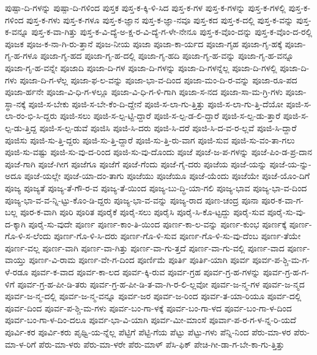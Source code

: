 {ಪುಷ್ಪಾ-ದಿ-ಗಳನ್ನು
ಪುಷ್ಪಾ-ದಿ-ಗಳಿಂದ
ಪುಸ್ತಕ
ಪುಸ್ತ-ಕ-ಕ್ಕಿ-ಳಿ-ಸಿದ
ಪುಸ್ತ-ಕ-ಗಳ
ಪುಸ್ತ-ಕ-ಗಳನ್ನು
ಪುಸ್ತ-ಕ-ಗಳಲ್ಲಿ
ಪುಸ್ತ-ಕ-ಗಳಿಂದ
ಪುಸ್ತ-ಕ-ಗಳು
ಪುಸ್ತ-ಕ-ಗಳೂ
ಪುಸ್ತ-ಕ-ಜ್ಞಾನ
ಪುಸ್ತ-ಕ-ಜ್ಞಾ-ನವೂ
ಪುಸ್ತ-ಕದ
ಪುಸ್ತ-ಕ-ದಲ್ಲಿ
ಪುಸ್ತ-ಕ-ವನ್ನು
ಪುಸ್ತ-ಕ-ವನ್ನೂ
ಪುಸ್ತ-ಕ-ವಾ-ಗಿತ್ತು
ಪುಸ್ತ-ಕ-ವಿ-ದ್ಯೆ-ಅ-ಕ್ಷ-ರ-ವಿ-ದ್ಯೆ-ಗ-ಳೇ-ನೇನೂ
ಪುಸ್ತ-ಕ-ವೊಂ-ದನ್ನು
ಪುಸ್ತ-ಕ-ವೊಂ-ದ-ರಲ್ಲಿ
ಪೂಜಕ
ಪೂಜ-ಕ-ನಾ-ಗಿ-ರು-ತ್ತಾನೆ
ಪೂಜ-ನೀಯ
ಪೂಜಾ
ಪೂಜಾ-ಕಾ-ರ್ಯದ
ಪೂಜಾ-ಗೃಹ
ಪೂಜಾ-ಗೃ-ಹಕ್ಕೆ
ಪೂಜಾ-ಗೃ-ಹ-ಗಳೂ
ಪೂಜಾ-ಗೃ-ಹದ
ಪೂಜಾ-ಗೃ-ಹ-ದಲ್ಲಿ
ಪೂಜಾ-ಗೃ-ಹದಿ
ಪೂಜಾ-ಗೃ-ಹ-ವನ್ನು
ಪೂಜಾ-ಗೃ-ಹ-ವನ್ನೂ
ಪೂಜಾ-ಗೃ-ಹ-ವನ್ನೇ
ಪೂಜಾದಿ
ಪೂಜಾ-ದಿ-ಗಳ
ಪೂಜಾ-ದಿ-ಗಳನ್ನು
ಪೂಜಾ-ದಿ-ಗಳನ್ನೆಲ್ಲ
ಪೂಜಾ-ದಿ-ಗಳಲ್ಲಿ
ಪೂಜಾ-ದಿ-ಗಳು
ಪೂಜಾ-ದಿ-ಗ-ಳೆಲ್ಲ
ಪೂಜಾ-ಫ-ಲ-ವನ್ನು
ಪೂಜಾ-ಭಾ-ವ-ದಿಂದ
ಪೂಜಾ-ಮಂ-ದಿ-ರ-ವನ್ನು
ಪೂಜಾ-ರೂ-ಪದ
ಪೂಜಾ-ರ್ಹನೇ
ಪೂಜಾ-ವಿ-ಧಿ-ಗ-ಳಲ್ಲೂ
ಪೂಜಾ-ವಿ-ಧಿ-ಗ-ಳಿ-ಗಾಗಿ
ಪೂಜಾ-ಸ-ನದ
ಪೂಜಾ-ಸಾ-ಮ-ಗ್ರಿ-ಗಳು
ಪೂಜಾ-ಸ್ಥಾ-ನಕ್ಕೆ
ಪೂಜಿ-ಸ-ಬೇಕು
ಪೂಜಿ-ಸ-ಬೇ-ಕೆಂ-ದಿ-ದ್ದೇನೆ
ಪೂಜಿ-ಸ-ಲಾ-ಗು-ತ್ತಿತ್ತು
ಪೂಜಿ-ಸ-ಲಾ-ಗು-ತ್ತಿ-ದೆಯೋ
ಪೂಜಿ-ಸ-ಲಾ-ರಂ-ಭಿ-ಸಿ-ದ್ದರು
ಪೂಜಿ-ಸಲು
ಪೂಜಿ-ಸ-ಲ್ಪ-ಟ್ಟಿ-ದ್ದಾರೆ
ಪೂಜಿ-ಸ-ಲ್ಪ-ಡ-ಲಿ-ದ್ದಾರೆ
ಪೂಜಿ-ಸ-ಲ್ಪ-ಡು-ತ್ತಾರೆ
ಪೂಜಿ-ಸ-ಲ್ಪ-ಡು-ತ್ತಿದ್ದ
ಪೂಜಿ-ಸ-ಲ್ಪ-ಡುವೆ
ಪೂಜಿಸಿ
ಪೂಜಿ-ಸಿ-ದರು
ಪೂಜಿ-ಸಿ-ದರೆ
ಪೂಜಿ-ಸಿ-ದ-ವ-ರ-ಲ್ಲವೆ
ಪೂಜಿ-ಸಿ-ದ್ದಾರೆ
ಪೂಜಿಸು
ಪೂಜಿ-ಸು-ತ್ತಿ-ದ್ದರು
ಪೂಜಿ-ಸು-ತ್ತಿ-ದ್ದಾರೆ
ಪೂಜಿ-ಸು-ತ್ತಿ-ರು-ವಾಗ
ಪೂಜಿ-ಸುವ
ಪೂಜಿ-ಸು-ವಂ-ತಾ-ಗಲು
ಪೂಜಿ-ಸು-ವಷ್ಟು
ಪೂಜಿ-ಸು-ವು-ದ-ರಿಂದ
ಪೂಜಿ-ಸು-ವು-ದೊಂದು
ಪೂಜೆ
ಪೂಜೆ-ಜ-ಪ-ಗಳನ್ನು
ಪೂಜೆ-ಪಿಂ-ಡ-ಪ್ರ-ದಾನ
ಪೂಜೆ-ಗಾಗಿ
ಪೂಜೆ-ಗೀಗ
ಪೂಜೆಗೂ
ಪೂಜೆಗೆ
ಪೂಜೆ-ಗೆಂದು
ಪೂಜೆ-ಗೈ-ದರು
ಪೂಜೆಯ
ಪೂಜೆ-ಯನ್ನು
ಪೂಜೆ-ಯ-ನ್ನು-ಅದೂ
ಪೂಜೆ-ಯಲ್ಲೇ
ಪೂಜೆ-ಯಾ-ದಂ-ತಾಗು
ಪೂಜೆಯು
ಪೂಜೆಯೂ
ಪೂಜೆ-ಯೆಂದು
ಪೂಜೆಯೇ
ಪೂಜೆ-ಯೊಂ-ದಿಗೆ
ಪೂಜ್ಯ
ಪೂಜ್ಯತೆ
ಪೂಜ್ಯ-ತೆ-ಗೌ-ರ-ವ
ಪೂಜ್ಯ-ತೆ-ಯಿಂದ
ಪೂಜ್ಯ-ಬು-ದ್ಧಿ-ಯಾ-ಗಲಿ
ಪೂಜ್ಯ-ಭಾವ
ಪೂಜ್ಯ-ಭಾ-ವ-ದಿಂದ
ಪೂಜ್ಯ-ಭಾ-ವ-ವ-ನ್ನಿ-ಟ್ಟು-ಕೊಂ-ಡಿ-ದ್ದರು
ಪೂಜ್ಯ-ಭಾ-ವ-ವನ್ನು
ಪೂಜ್ಯ-ರಾದ
ಪೂಣ-ಚಂದ್ರ
ಪೂನಾ
ಪೂರ-ಕ-ವಾ-ಗ-ಬಲ್ಲ
ಪೂರ-ಕ-ವಾಗಿ
ಪೂರಿ
ಪೂರಿತ
ಪೂರೈಕೆ
ಪೂರೈ-ಸಲು
ಪೂರೈಸಿ
ಪೂರೈ-ಸಿ-ಕೊ-ಟ್ಟದ್ದು
ಪೂರೈ-ಸುವ
ಪೂರೈ-ಸು-ವು-ದ-ಕ್ಕಾಗಿ
ಪೂರೈ-ಸು-ವುದೇ
ಪೂರ್ಣ
ಪೂರ್ಣ-ಕಾಂ-ತಿ-ಯಿಂದ
ಪೂರ್ಣ-ಕಾ-ಲ-ವನ್ನು
ಪೂರ್ಣ-ಕುಂಭ
ಪೂರ್ಣಕ್ಕೆ
ಪೂರ್ಣ-ಗೊ-ಳಿ-ಸ-ಲೆಂದು
ಪೂರ್ಣ-ಗೊ-ಳಿ-ಸಿ-ದರು
ಪೂರ್ಣ-ಗೊ-ಳಿ-ಸುವ
ಪೂರ್ಣ-ಗೊ-ಳಿ-ಸು-ವು-ದೆಂಬ
ಪೂರ್ಣ-ತೆಯೇ
ಪೂರ್ಣ-ವಲ್ಲ
ಪೂರ್ಣ-ವಾಗಿ
ಪೂರ್ಣ-ವಾ-ಗಿತ್ತು
ಪೂರ್ಣ-ವಾ-ಗು-ತ್ತದೆ
ಪೂರ್ಣ-ವಾ-ಗು-ವಲ್ಲಿ
ಪೂರ್ಣ-ವಾದ
ಪೂರ್ಣ-ವಾಯ್ತು
ಪೂರ್ಣ-ವಿ-ರಾಮ
ಪೂರ್ಣ-ವೇ-ಗ-ದಿಂದ
ಪೂರ್ಣಿಮೆ
ಪೂರ್ತಿ
ಪೂರ್ತಿ-ಯಾಗಿ
ಪೂರ್ವ
ಪೂರ್ವ-ಪ-ಶ್ಚಿ-ಮ-ಗ-ಳೆ-ರಡೂ
ಪೂರ್ವ-ಕ-ವಾದ
ಪೂರ್ವ-ಕಾ-ಲದ
ಪೂರ್ವ-ಕ್ಕಿ-ರುವ
ಪೂರ್ವ-ಗ್ರಹ
ಪೂರ್ವ-ಗ್ರ-ಹ-ಗಳನ್ನು
ಪೂರ್ವ-ಗ್ರ-ಹ-ಗ-ಳಿಗೆ
ಪೂರ್ವ-ಗ್ರ-ಹ-ಪೀ-ಡಿ-ತರು
ಪೂರ್ವ-ಗ್ರ-ಹ-ಪೀ-ಡಿ-ತ-ವಾ-ಗಿ-ರ-ಲಿ-ಲ್ಲವೋ
ಪೂರ್ವ-ಜ-ನ್ಮ-ಗಳ
ಪೂರ್ವ-ಜ-ನ್ಮದ
ಪೂರ್ವ-ಜ-ನ್ಮ-ದಲ್ಲಿ
ಪೂರ್ವ-ಜ-ನ್ಮ-ವನ್ನೂ
ಪೂರ್ವ-ಜರ
ಪೂರ್ವ-ಜ-ರಿಂದ
ಪೂರ್ವ-ತ-ಯಾ-ರಿಯೂ
ಪೂರ್ವ-ದಲ್ಲಿ
ಪೂರ್ವ-ದಿಂದ
ಪೂರ್ವ-ಪ-ಶ್ಚಿ-ಮ-ಗಳು
ಪೂರ್ವ-ಬಂ-ಗಾ-ಳಕ್ಕೆ
ಪೂರ್ವ-ಬಂ-ಗಾ-ಳದ
ಪೂರ್ವ-ಬಂ-ಗಾ-ಳ-ದಿಂದ
ಪೂರ್ವ-ಬಂ-ಗಾ-ಳ-ದಿಂ-ದಲೂ
ಪೂರ್ವ-ಭಾ-ವಿ-ಯಾಗಿ
ಪೂರ್ವ-ಮೀ-ಮಾಂಸೆ
ಪೂರ್ವಾ-ಪ-ರ-ಗ-ಳ-ನ್ನ-ರಿ-ಯದೆ
ಪೂರ್ವಿ-ಕರ
ಪೂರ್ವಿ-ಕರು
ಪೃಥ್ವಿ-ಯ-ನ್ನೆಲ್ಲ
ಪೆಟ್ಟಿಗೆ
ಪೆಟ್ಟಿ-ಗೆಯ
ಪೆಟ್ಟು
ಪೆಟ್ಟು-ಗಳು
ಪೆನ್ನಿ-ನಿಂದ
ಪೆರು-ಮಾ-ಳರ
ಪೆರು-ಮಾ-ಳ-ರಿಗೆ
ಪೆರು-ಮಾ-ಳರು
ಪೆರು-ಮಾ-ಳರೇ
ಪೆರು-ಮಾಳ್
ಪೆಸಿ-ಫಿಕ್
ಪೇಚಿ-ಗೀ-ಡಾ-ಗ-ಬೇ-ಕಾ-ಗು-ತ್ತಿತ್ತು
}
